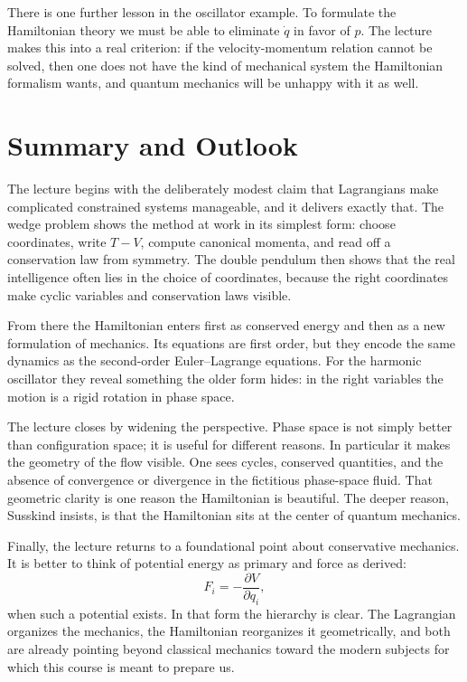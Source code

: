 There is one further lesson in the oscillator example. To formulate the Hamiltonian theory we must be able to eliminate \(\dot q\) in favor of \(p\). The lecture makes this into a real criterion: if the velocity-momentum relation cannot be solved, then one does not have the kind of mechanical system the Hamiltonian formalism wants, and quantum mechanics will be unhappy with it as well.

\section{Summary and Outlook}

The lecture begins with the deliberately modest claim that Lagrangians make complicated constrained systems manageable, and it delivers exactly that. The wedge problem shows the method at work in its simplest form: choose coordinates, write \(T-V\), compute canonical momenta, and read off a conservation law from symmetry. The double pendulum then shows that the real intelligence often lies in the choice of coordinates, because the right coordinates make cyclic variables and conservation laws visible.

From there the Hamiltonian enters first as conserved energy and then as a new formulation of mechanics. Its equations are first order, but they encode the same dynamics as the second-order Euler--Lagrange equations. For the harmonic oscillator they reveal something the older form hides: in the right variables the motion is a rigid rotation in phase space.

The lecture closes by widening the perspective. Phase space is not simply better than configuration space; it is useful for different reasons. In particular it makes the geometry of the flow visible. One sees cycles, conserved quantities, and the absence of convergence or divergence in the fictitious phase-space fluid. That geometric clarity is one reason the Hamiltonian is beautiful. The deeper reason, Susskind insists, is that the Hamiltonian sits at the center of quantum mechanics.

Finally, the lecture returns to a foundational point about conservative mechanics. It is better to think of potential energy as primary and force as derived:
\[
F_i=-\frac{\partial V}{\partial q_i},
\]
when such a potential exists. In that form the hierarchy is clear. The Lagrangian organizes the mechanics, the Hamiltonian reorganizes it geometrically, and both are already pointing beyond classical mechanics toward the modern subjects for which this course is meant to prepare us.
